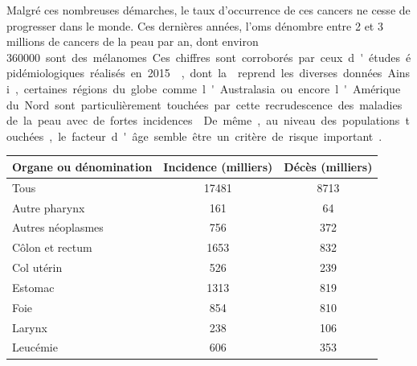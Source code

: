 Malgré ces nombreuses démarches, le taux d’occurrence de ces cancers ne cesse de progresser dans le monde. Ces dernières années, l'\gls{oms} dénombre entre 2 et 3 millions de cancers de la peau par an, dont environ \SI{360000} sont des mélanomes. Ces chiffres sont corroborés par ceux d'études épidémiologiques réalisés en 2015~\cite{Vos2016}, dont la  reprend les diverses données. Ainsi, certaines régions du globe comme l'Australasia ou encore l'Amérique du Nord sont particulièrement touchées par cette recrudescence des maladies de la peau avec de fortes incidences~\cite{Karimkhani2017}. De même, au niveau des populations touchées, le facteur d'âge semble être un critère de risque important~\cite{Karimkhani2017}.\par 
    
\begin{table}[H]
    \renewcommand{\bfseries}{\fontseries{b}\selectfont}
    \newrobustcmd{\B}{\bfseries}   
    \centering
    \begin{tabular}{lSS} \toprule
        \textbf{Organe ou dénomination}         & \textbf{Incidence (milliers)} & \textbf{Décès (milliers)} \\ \midrule
        Tous                                    & 17481                         & 8713                      \\
        Autre pharynx                           & 161                           & 64                        \\
        Autres néoplasmes                       & 756                           & 372                       \\
        Côlon et rectum                         & 1653                          & 832                       \\
        Col utérin                              & 526                           & 239                       \\
        Estomac                                 & 1313                          & 819                       \\
        Foie                                    & 854                           & 810                       \\
        Larynx                                  & 238                           & 106                       \\
        Leucémie                                & 606                           & 353                       \\

\end{tabular}
\end{table}
